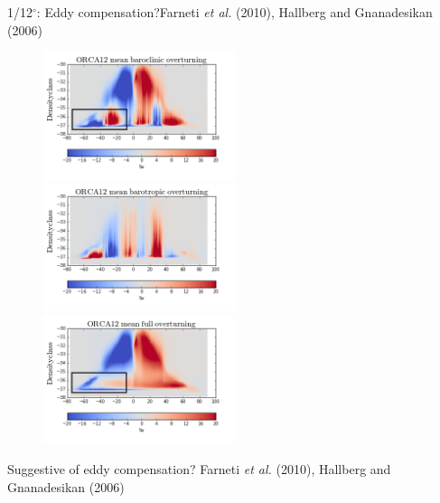 \documentclass{beamer}
\begin{document}
\begin{frame}{1/12$^{\circ}$: Eddy compensation?\tiny Farneti \textit{et al.} (2010), Hallberg and Gnanadesikan (2006)}
 \begin{figure}[H]
\centering
\includegraphics[width=0.5\textwidth]{mocsigORCA12MeanBaroc_BOX.png}
\includegraphics[width=0.5\textwidth]{mocsigORCA12MeanBarot.png}\\
\includegraphics[width=0.5\textwidth]{mocsigORCA12MeanFull_BOX.png}
\end{figure}
\begin{alertblock}{}
 Suggestive of eddy compensation? \tiny Farneti \textit{et al.} (2010), Hallberg and Gnanadesikan (2006)
\end{alertblock}
\end{frame}
\end{document}
